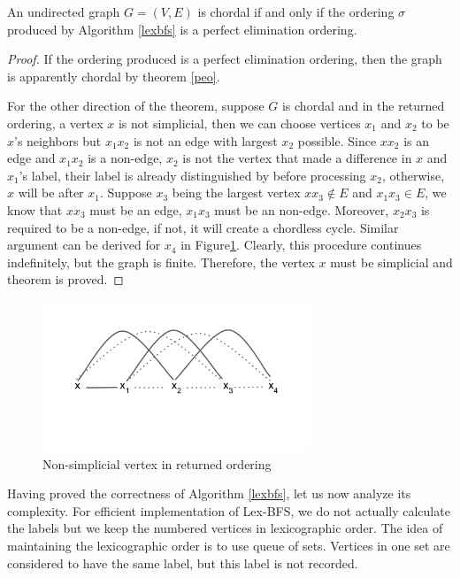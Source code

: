 \begin{theorem}
An undirected graph $G = (V,E)$ is chordal if and only if the ordering $\sigma$ produced by Algorithm \ref{lexbfs} is a perfect elimination ordering. 
\end{theorem}

\begin{proof}
If the ordering produced is a perfect elimination ordering, then the graph is apparently chordal by theorem \ref{peo}.

For the other direction of the theorem, suppose $G$ is chordal and in the returned ordering, a vertex $x$ is not simplicial, then we can choose vertices $x_1$ and $x_2$ to be $x$'s neighbors but $x_1 x_2$ is not an edge with largest $x_2$ possible. Since $x x_2$ is an edge and $x_1 x_2$ is a non-edge, $x_2$ is not the vertex that made a difference in $x$ and $x_1$'s label, their label is already distinguished by before processing $x_2$, otherwise, $x$ will be after $x_1$. Suppose $x_3$ being the largest vertex $x x_3 \notin E$ and $x_1 x_3 \in E$, we know that $x x_3$ must be an edge, $x_1 x_3$ must be an non-edge. Moreover, $x_2 x_3$ is required to be a non-edge, if not, it will create a chordless cycle. Similar argument can be derived for $x_4$ in Figure\ref{peo_proof_1}. Clearly, this procedure continues indefinitely, but the graph is finite. Therefore, 
the vertex $x$ must be simplicial and theorem is proved.
\end{proof}

\begin{figure}[H]
\centering
\includegraphics[width=8cm]{figures/lex_proof1}
\caption{Non-simplicial vertex in returned ordering}
\label{peo_proof_1}
\end{figure}

Having proved the correctness of Algorithm \ref{lexbfs}, let us now analyze its complexity. For efficient implementation of Lex-BFS, we do not actually calculate the labels but we keep the numbered vertices in lexicographic order. The idea of maintaining the lexicographic order is to use queue of sets. Vertices in one set are considered to have the same label, but this label is not recorded. 

